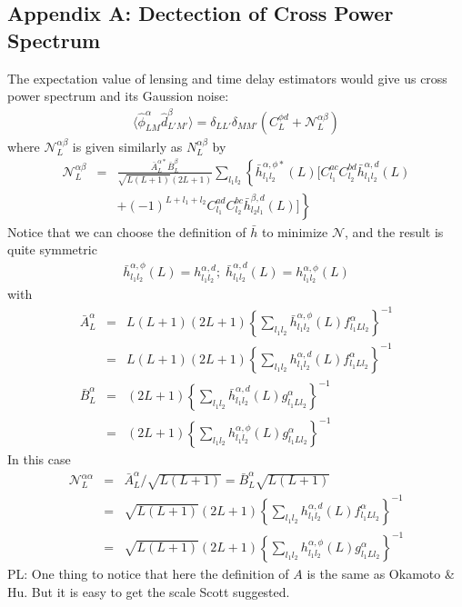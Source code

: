 \documentclass[prl,amsmath,amssymb,floatfix,superscriptaddress,nofootinbib,twocolumn]{revtex4-1}
\def\bea{\begin{eqnarray}}
\def\eea{\end{eqnarray}}
\newcommand{\eql}[1]{\label{eq:#1}}
\newcommand{\peikai}[1]{{\color{blue} PL: #1}}
\begin{document}
\begin{appendices}
\section{Appendix A: Dectection of Cross Power Spectrum}
The expectation value of lensing and time delay estimators would give us cross power spectrum and its Gaussion noise:
\bea
\langle \hat{\phi}^{\alpha}_{LM} \hat{d}^{\beta}_{L'M'}\rangle = \delta_{LL'}\delta_{MM'}(C_{L}^{\phi d}+\mathcal{N}_{L}^{\alpha \beta})
\eea
where $\mathcal{N}^{\alpha \beta}_{L}$ is given similarly as $N_{L}^{\alpha \beta}$ by
\bea
\mathcal{N}_{L}^{\alpha\beta}&=&\frac{\bar{A}_{L}^{\alpha*}\bar{B}_{L}^{\beta}}{\sqrt{L(L+1)}(2L+1)}\sum_{l_{1}l_{2}}  \left\{ \bar{h}_{l_{1}l_{2}}^{\alpha,\phi*} (L)\big[ C_{l_{1}}^{ac}C_{l_{2}}^{bd}\bar{h}_{l_{1}l_{2}}^{\alpha,d}(L)\right. \nonumber \\
&&\left. +(-1)^{L+l_{1}+l_{2}}C_{l_{1}}^{ad}C_{l_{2}}^{bc} \bar{h}_{l_{2}l_{1}}^{\beta,d}(L)  \big]\right\}\eql{full}
\eea
Notice that we can choose the definition of $\bar{h}$ to minimize $\mathcal{N}$, and the result is quite symmetric
\bea 
\bar{h}_{l_{1}l_{2}}^{\alpha,\phi}(L) =h_{l_{1}l_{2}}^{\alpha,d}; \; \bar{h}_{l_{1}l_{2}}^{\alpha,d}(L)= h_{l_{1}l_{2}}^{\alpha,\phi} (L)
\eea 
with 
\bea 
\bar{A}_{L}^{\alpha} &=& L(L+1)(2L+1)\left\{ \sum_{l_{1}l_{2}}\bar{h}_{l_{1}l_{2}}^{\alpha,\phi}(L)f_{l_{1}Ll_{2}}^{\alpha} \right\}^{-1} \nonumber \\
&=& L(L+1)(2L+1)\left\{ \sum_{l_{1}l_{2}}h_{l_{1}l_{2}}^{\alpha,d}(L)f_{l_{1}Ll_{2}}^{\alpha} \right\}^{-1} \\
\bar{B}_{L}^{\alpha} &=& (2L+1)\left\{ \sum_{l_{1}l_{2}}\bar{h}_{l_{1}l_{2}}^{\alpha,d}(L)g_{l_{1}Ll_{2}}^{\alpha} \right\}^{-1} \nonumber \\
&=& (2L+1)\left\{ \sum_{l_{1}l_{2}}h_{l_{1}l_{2}}^{\alpha,\phi}(L)g_{l_{1}Ll_{2}}^{\alpha} \right\}^{-1}
\eea 
In this case
\bea
\mathcal{N}_{L}^{\alpha \alpha} &=& \bar{A}_{L}^{\alpha} /\sqrt{L(L+1)}=\bar{B}_{L}^{\alpha}  \sqrt{L(L+1)} \nonumber \\
&=& \sqrt{L(L+1)}(2L+1)\left\{ \sum_{l_{1}l_{2}}h_{l_{1}l_{2}}^{\alpha,d}(L)f_{l_{1}Ll_{2}}^{\alpha} \right\}^{-1} \nonumber \\
&=& \sqrt{L(L+1)}(2L+1)\left\{ \sum_{l_{1}l_{2}}h_{l_{1}l_{2}}^{\alpha,\phi}(L)g_{l_{1}Ll_{2}}^{\alpha} \right\}^{-1}
\eea
\peikai{One thing to notice that here the definition of $A$ is the same as Okamoto \& Hu. But it is easy to get the scale Scott suggested.}


\end{appendices}
\end{document}
